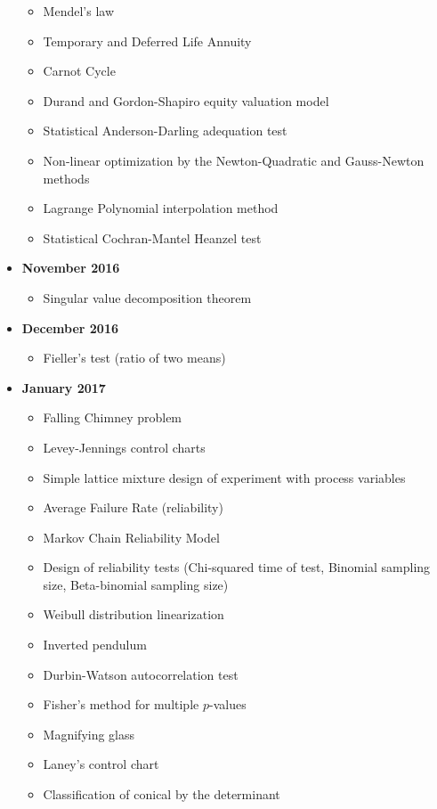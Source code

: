 \documentclass[12pt,a4paper,twoside,openright]{report}
\theoremstyle{definition}
\theoremstyle{itexmp}
\numberwithin{equation}{section}
\begin{document}
\begin{itemize}
\begin{itemize}[noitemsep]
				\item Mendel's law
				\item Temporary and Deferred Life Annuity
				\item Carnot Cycle
				\item Durand and Gordon-Shapiro equity valuation model 
				\item Statistical Anderson-Darling adequation test
				\item Non-linear optimization by the Newton-Quadratic and Gauss-Newton methods
				\item Lagrange Polynomial interpolation method
				\item Statistical Cochran-Mantel Heanzel test
			\end{itemize}
		\item \textbf{November 2016}
			\begin{itemize}[noitemsep]
				\item Singular value decomposition theorem
			\end{itemize}
		\item \textbf{December 2016}
			\begin{itemize}[noitemsep]
				\item Fieller's test (ratio of two means)
			\end{itemize}
		\item \textbf{January 2017}
			\begin{itemize}[noitemsep]
				\item Falling Chimney problem
				\item Levey-Jennings control charts
				\item Simple lattice mixture design of experiment with process variables
				\item Average Failure Rate (reliability)
				\item Markov Chain Reliability Model
				\item Design of reliability tests (Chi-squared time of test, Binomial sampling size, Beta-binomial sampling size)
				\item Weibull distribution linearization
				\item Inverted pendulum
				\item Durbin-Watson autocorrelation test
				\item Fisher's method for multiple $p$-values
				\item Magnifying glass
				\item Laney's control chart
				\item Classification of conical by the determinant	

\end{itemize}
\end{itemize}
\end{document}
